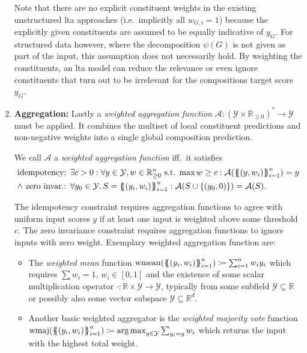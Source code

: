 \begin{enumerate}[label=\textbf{\arabic*.}]
		Note that there are no explicit constituent weights in the existing unstructured \ac{lta} approaches (i.e.\ implicitly all $w_{G, i} = 1$) because the explicitly given constituents are assumed to be equally indicative of $y_G$.
		For structured data however, where the decomposition $\psi(G)$ is not given as part of the input, this assumption does not necessarily hold.
		By weighting the constituents, an \ac{lta} model can reduce the relevance or even ignore constituents that turn out to be irrelevant for the compositions target score $y_G$.
	\item \textbf{Aggregation:}
		Lastly a \textit{weighted aggregation function} $\mathcal{A}: {(\mathcal{Y} \times \mathbb{R}_{\geq 0})}^{*} \to \mathcal{Y}$ must be applied.
		It combines the multiset of local constituent predictions and non-negative weights into a single global composition prediction.
		\begin{defn}\label{defn:ltag:weighted-agg}
			We call $\mathcal{A}$ a \textit{weighted aggregation function} iff.\ it satisfies
			\begin{align*}
				\text{idempotency: } & \exists c > 0: \forall y \in \mathcal{Y}, w \in \mathbb{R}_{\geq 0}^n\text{ s.t. }{\max w} \geq c: \mathcal{A}({\ldblbrace (y, w_i) \rdblbrace}_{i=1}^n) = y \\
				\land\text{ zero invar.: } & \forall y_0 \in \mathcal{Y}, S = {\ldblbrace (y_i, w_i) \rdblbrace}_{i=1}^n: \mathcal{A}(S \cup \{ (y_0, 0) \}) = \mathcal{A}(S) \text{.}
			\end{align*}
		\end{defn}
		{\setlength{\parskip}{0pt}The idempotency constraint requires aggregation functions to agree with uniform input scores $y$ if at least one input is weighted above some threshold $c$.
		The zero invariance constraint requires aggregation functions to ignore inputs with zero weight.
		Exemplary weighted aggregation function are:}
		\begin{itemize}
			\item The \textit{weighted mean} function $\wmean({\ldblbrace (y_i, w_i) \rdblbrace}_{i=1}^n) \coloneqq \sum_{i=1}^n w_i y_i$ which requires $\sum w_i = 1$, $w_i \in [0, 1]$ and the existence of some scalar multiplication operator $\cdot: \mathbb{R} \times \mathcal{Y} \to \mathcal{Y}$, typically from some subfield $\mathcal{Y} \subseteq \mathbb{R}$ or possibly also some vector subspace $\mathcal{Y} \subseteq \mathbb{R}^d$.
			\item Another basic weighted aggregator is the \textit{weighted majority vote} function $\wmaj({\ldblbrace (y_i, w_i) \rdblbrace}_{i=1}^n) \coloneqq {\arg\max}_{y \in \mathcal{Y}} \sum_{y_i = y} w_i$ which returns the input with the highest total weight.

\end{itemize}
\end{enumerate}

